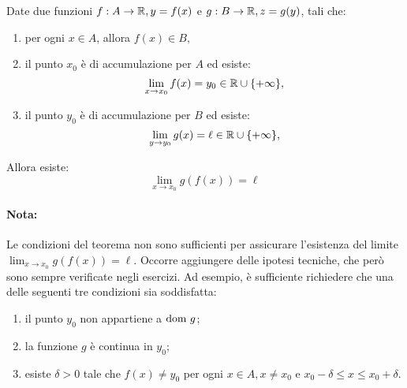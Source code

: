 \begin{teo}
Date due funzioni $f:A\rightarrow\mathbb{R},y=f(x)$ e $g:B\rightarrow\mathbb{R},z=g(y)$, tali che:
\begin{enumerate}
\item per ogni $x\in A$, allora $f(x)\in B,$
\item il punto $x_0$ è di accumulazione per $A$ ed esiste:
\[\lim_{x\to x_0}{f(x)}=y_0\in\mathbb{R}\cup\{+\infty\},\]
\item il punto $y_0$ è di accumulazione per $B$ ed esiste:
\[\lim_{y\to y_0}{g(x)}=\ell\in\mathbb{R}\cup\{+\infty\},\]
\end{enumerate}
Allora esiste:
\[\lim_{x\to x_0}{g(f(x))}=\ell\]
\paragraph{Nota:}
Le condizioni del teorema non sono sufficienti per assicurare l'esistenza del limite $\lim_{x\to x_0}{g(f(x))}=\ell$. Occorre aggiungere delle ipotesi tecniche, che però sono sempre verificate negli esercizi. Ad esempio, è sufficiente richiedere che una delle seguenti tre condizioni sia soddisfatta:
\begin{enumerate}
\item il punto $y_0$ non appartiene a $\text{dom }{g}$;
\item la funzione $g$ è continua in $y_0$;
\item esiste $\delta>0$ tale che $f(x)\neq y_0$ per ogni $x\in A,x\neq x_0$ e $x_0-\delta\leq x\leq x_0+\delta$.
\end{enumerate}
\end{teo}
